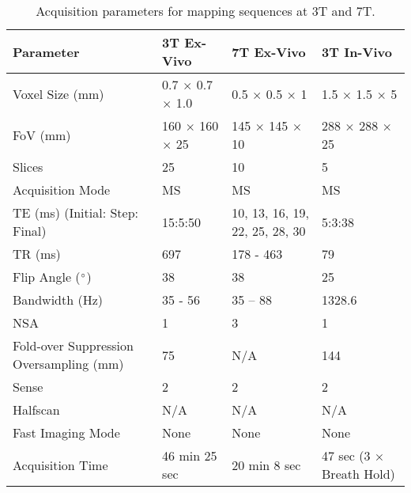 \begin{table}[H]
	\centering
	\begin{tabularx}{1.0\textwidth}{X|X|X|X}
		\textbf{Parameter}                      & \textbf{3T Ex-Vivo} & \textbf{7T Ex-Vivo}            & \textbf{3T In-Vivo}      \\ \hline
		Voxel Size (mm)                         & 0.7 $\times$ 0.7 $\times$ 1.0     & 0.5 $\times$ 0.5 $\times$ 1                  & 1.5 $\times$ 1.5 $\times$ 5            \\ \hline
		FoV (mm)                                & 160 $\times$ 160 $\times$ 25      & 145 $\times$ 145 $\times$ 10                 & 288 $\times$ 288 $\times$ 25           \\ \hline
		Slices                                  & 25                  & 10                             & 5                        \\ \hline
		Acquisition Mode                        & MS                  & MS                             & MS                       \\ \hline
		TE (ms) (Initial: Step: Final)          & 15:5:50             & 10, 13, 16, 19, 22, 25, 28, 30 & 5:3:38                   \\ \hline
		TR (ms)                                 & 697                 & 178 - 463                      & 79                       \\ \hline
		Flip Angle ($\degree$)                  & 38                  & 38                             & 25                       \\ \hline
		Bandwidth (Hz)                          & 35 - 56             & 35 – 88                        & 1328.6                   \\ \hline
		NSA                                     & 1                   & 3                              & 1                        \\ \hline
		Fold-over Suppression Oversampling (mm) & 75                  & N/A                            & 144                      \\ \hline
		Sense                                   & 2                   & 2                              & 2                        \\ \hline
		Halfscan                                & N/A                 & N/A                            & N/A                      \\ \hline
		Fast Imaging Mode                       & None                & None                           & None                     \\ \hline
		Acquisition Time                        & 46 min 25 sec       & 20 min 8 sec                   & 47 sec (3 $\times$ Breath Hold)
	\end{tabularx}
	\caption{Acquisition parameters for \ttwostar mapping sequences at 3T and 7T.}
	\label{tab:ex_t2star_mapping}
\end{table}

